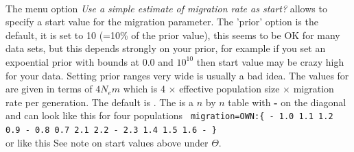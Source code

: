 \begin{description}
\item{\\
The menu option \textsl{Use a simple estimate of migration rate as start?} allows to specify a start value for the migration parameter. 
The 'prior' option is the default, it is set to 10 (=10\% of the prior value), this seems to be OK for many data sets, but this depends strongly on your prior, for example if you set an expoential prior with bounds at $0.0$ and $10^10$ then start value may be crazy high for your data. Setting prior ranges very wide is usually a bad idea.
The values for {} are given in terms of $4N_em$ which is 4 $\times$ effective population size $\times$ migration rate per generation.
The default is . 
The  is a $n$ by $n$ table with \textbf{ -} on the diagonal and can look 
like this for four populations
\texttt{ migration=OWN:\{ - 1.0 1.1 1.2 0.9 - 0.8 0.7 2.1 2.2 - 2.3 1.4 1.5 1.6 - \}}\\
or like this
See note on start values above under $\Theta$.}
\end{description}

